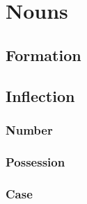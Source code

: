 \chapter{Nouns}

\section{Formation}

\section{Inflection}

\subsection{Number}

\subsection{Possession}

\subsection{Case}